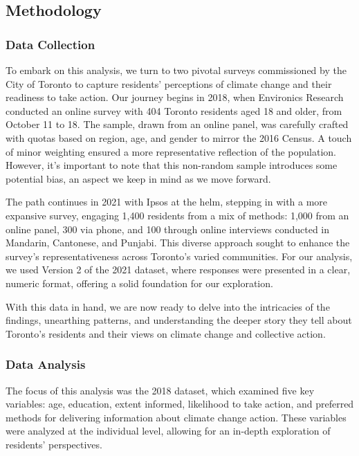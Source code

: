 \documentclass[
  letterpaper,
  DIV=11,
  numbers=noendperiod]{scrartcl}
\begin{document}
\subsection{Methodology}\label{methodology}

\subsubsection{Data Collection}\label{data-collection}

To embark on this analysis, we turn to two pivotal surveys commissioned
by the City of Toronto to capture residents' perceptions of climate
change and their readiness to take action. Our journey begins in 2018,
when Environics Research conducted an online survey with 404 Toronto
residents aged 18 and older, from October 11 to 18. The sample, drawn
from an online panel, was carefully crafted with quotas based on region,
age, and gender to mirror the 2016 Census. A touch of minor weighting
ensured a more representative reflection of the population. However,
it's important to note that this non-random sample introduces some
potential bias, an aspect we keep in mind as we move forward.

The path continues in 2021 with Ipsos at the helm, stepping in with a
more expansive survey, engaging 1,400 residents from a mix of methods:
1,000 from an online panel, 300 via phone, and 100 through online
interviews conducted in Mandarin, Cantonese, and Punjabi. This diverse
approach sought to enhance the survey's representativeness across
Toronto's varied communities. For our analysis, we used Version 2 of the
2021 dataset, where responses were presented in a clear, numeric format,
offering a solid foundation for our exploration.

With this data in hand, we are now ready to delve into the intricacies
of the findings, unearthing patterns, and understanding the deeper story
they tell about Toronto's residents and their views on climate change
and collective action.

\subsubsection{Data Analysis}\label{data-analysis}

The focus of this analysis was the 2018 dataset, which examined five key
variables: age, education, extent informed, likelihood to take action,
and preferred methods for delivering information about climate change
action. These variables were analyzed at the individual level, allowing
for an in-depth exploration of residents' perspectives.
\end{document}
